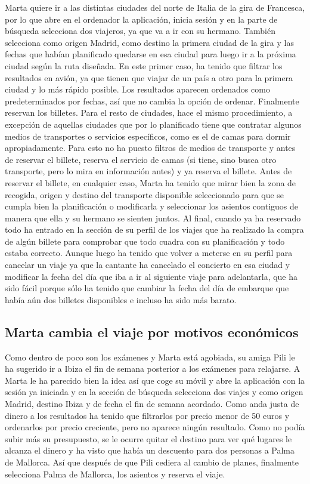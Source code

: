 Marta quiere ir a las distintas ciudades del norte de Italia de la gira de
Francesca, por lo que abre en el ordenador la aplicación, inicia sesión y en la
parte de búsqueda selecciona dos viajeros, ya que va a ir con su hermano.
También selecciona como origen Madrid, como destino la primera ciudad de la
gira y las fechas que habían planificado quedarse en esa ciudad para luego ir a
la próxima ciudad según la ruta diseñada. En este primer caso, ha tenido que
filtrar los resultados en avión, ya que tienen que viajar de un país a otro
para la primera ciudad y lo más rápido posible. Los resultados aparecen
ordenados como predeterminados por fechas, así que no cambia la opción de
ordenar. Finalmente reservan los billetes. Para el resto de ciudades, hace el
mismo procedimiento, a excepción de aquellas ciudades que por lo planificado
tiene que contratar algunos medios de transportes o servicios específicos, como
es el de camas para dormir apropiadamente. Para esto no ha puesto filtros de
medios de transporte y antes de reservar el billete, reserva el servicio de
camas (si tiene, sino busca otro transporte, pero lo mira en información antes)
y ya reserva el billete. Antes de reservar el billete, en cualquier caso, Marta
ha tenido que mirar bien la zona de recogida, origen y destino del transporte
disponible seleccionado para que se cumpla bien la planificación o modificarla
y seleccionar los asientos contiguos de manera que ella y su hermano se sienten
juntos. Al final, cuando ya ha reservado todo ha entrado en la sección de su
perfil de los viajes que ha realizado la compra de algún billete para comprobar
que todo cuadra con su planificación y todo estaba correcto. Aunque luego ha
tenido que volver a meterse en su perfil para cancelar un viaje ya que la
cantante ha cancelado el concierto en esa ciudad y modificar la fecha del día
que iba a ir al siguiente viaje para adelantarla, que ha sido fácil porque sólo
ha tenido que cambiar la fecha del día de embarque que había aún dos billetes
disponibles e incluso ha sido más barato.

\subsection{Marta cambia el viaje por motivos económicos}

Como dentro de poco son los exámenes y Marta está agobiada, su amiga Pili le ha
sugerido ir a Ibiza el fin de semana posterior a los exámenes para relajarse. A
Marta le ha parecido bien la idea así que coge su móvil y abre la aplicación
con la sesión ya iniciada y en la sección de búsqueda selecciona dos viajes y
como origen Madrid, destino Ibiza y de fecha el fin de semana acordado. Como
anda justa de dinero a los resultados ha tenido que filtrarlos por precio menor
de 50 euros y ordenarlos por precio creciente, pero no aparece ningún
resultado. Como no podía subir más su presupuesto, se le ocurre quitar el
destino para ver qué lugares le alcanza el dinero y ha visto que había un
descuento para dos personas a Palma de Mallorca. Así que después de que Pili
cediera al cambio de planes, finalmente selecciona Palma de Mallorca, los
asientos y reserva el viaje.

